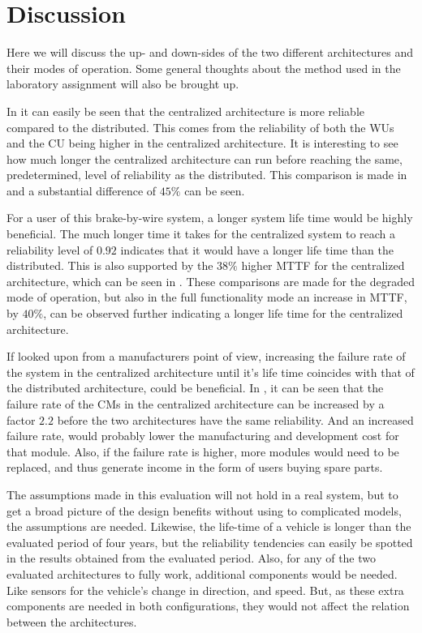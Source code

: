 \newpage
\section{Discussion}
\label{S5}
Here we will discuss the up- and down-sides of the two different architectures and their modes of operation. Some general thoughts about the method used in the laboratory assignment will also be brought up.

In  it can easily be seen that the centralized architecture is more reliable compared to the distributed. This comes from the reliability of both the WUs and the CU being higher in the centralized architecture. It is interesting to see how much longer the centralized architecture can run before reaching the same, predetermined, level of reliability as the distributed. This comparison is made in  and a substantial difference of $45\%$ can be seen. 

For a user of this brake-by-wire system, a longer system life time would be highly beneficial. The much longer time it takes for the centralized system to reach a reliability level of $0.92$ indicates that it would have a longer life time than the distributed. This is also supported by the $38\%$ higher MTTF for the centralized architecture, which can be seen in . These comparisons are made for the degraded mode of operation, but also in the full functionality mode an increase in MTTF, by $40\%$, can be observed further indicating a longer life time for the centralized architecture.   

If looked upon from a manufacturers point of view, increasing the failure rate of the system in the centralized architecture until it's life time coincides with that of the distributed architecture, could be beneficial. In , it can be seen that the failure rate of the CMs in the centralized architecture can be increased by a factor $2.2$ before the two architectures have the same reliability. And an increased failure rate, would probably lower the manufacturing and development cost for that module. Also, if the failure rate is higher, more modules would need to be replaced, and thus generate income in the form of users buying spare parts. 

The assumptions made in this evaluation will not hold in a real system, but to get a broad picture of the design benefits without using to complicated models, the assumptions are needed. Likewise, the life-time of a vehicle is longer than the evaluated period of four years, but the reliability tendencies can easily be spotted in the results obtained from the evaluated period. Also, for any of the two evaluated architectures to fully work, additional components would be needed. Like sensors for the vehicle's change in direction, and speed. But, as these extra components are needed in both configurations, they would not affect the relation between the architectures.

